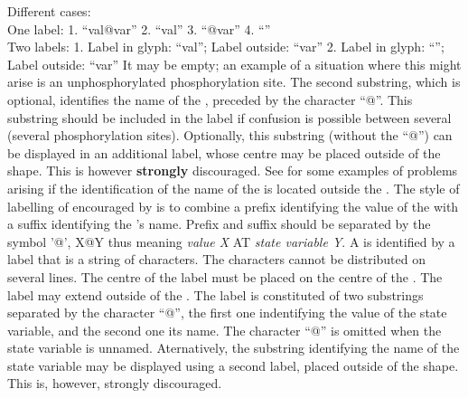 \begin{glyphDescription}
{{Different cases:\\
One label: 1. ``val@var'' 2. ``val'' 3. ``@var'' 4. ``''\\
Two labels: 1. Label in glyph: ``val''; Label outside: ``var'' 2. Label in glyph: ``''; Label outside: ``var''}
It may be empty; an example of a situation where this might arise is an unphosphorylated phosphorylation site.
The second substring, which is optional, identifies the name of the , preceded by the character ``@''.
This substring should be included in the label if confusion is possible between several  (\eg several phosphorylation sites).
Optionally, this substring (without the ``@'') can be displayed in an additional label, whose centre may be placed outside of the shape.
This is however \textbf{strongly} discouraged.
See  for some examples of problems arising if the identification of the name of the  is located outside the .
The style of labelling of  encouraged by \SBGNPDLone is to combine a prefix identifying the value of the  with a suffix identifying the 's name.
Prefix and suffix should be separated by the symbol '@', X@Y thus meaning \emph{value X} AT \emph{state variable Y}.
}{
\glyphLabel
A  is identified by a label that is  a string of characters.
The characters cannot be distributed on several lines.
The centre of the label must be placed on the centre of the .
The label may extend outside of the .
The label is constituted of two substrings separated by the character ``@'', the first one indentifying the value of the state variable, and the second one its name.
The character ``@'' is omitted when the state variable is unnamed.
Aternatively, the substring identifying the name of the state variable may be displayed using a second label, placed outside of the shape.
This is, however, strongly discouraged.
}



\end{glyphDescription}
